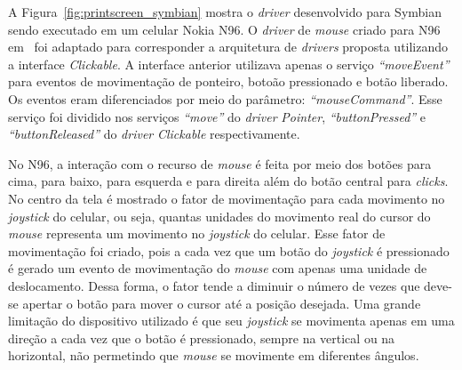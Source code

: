 A Figura~\ref{fig:printscreen_symbian} mostra o \emph{driver} desenvolvido para Symbian sendo executado em um celular Nokia N96. O \emph{driver} de \emph{mouse} criado para N96 em~\cite{buzeto2010} foi adaptado para corresponder a arquitetura de \emph{drivers} proposta utilizando a interface \emph{Clickable}. A interface anterior utilizava apenas o serviço \emph{``moveEvent''}	para eventos de movimentação de ponteiro, botoão pressionado e botão liberado. Os eventos eram diferenciados por meio do parâmetro: \emph{``mouseCommand''}. Esse serviço foi dividido nos serviços \emph{``move''} do \emph{driver} \emph{Pointer}, \emph{``buttonPressed''} e \emph{``buttonReleased''} do \emph{driver} \emph{Clickable} respectivamente.

No N96, a interação com o recurso de \emph{mouse} é feita por meio dos botões para cima, para baixo, para esquerda e para direita além do botão central para \emph{clicks}. No centro da tela é mostrado o fator de movimentação para cada movimento no \emph{joystick} do celular, ou seja, quantas unidades do movimento real do cursor do \emph{mouse} representa um movimento no \emph{joystick} do celular. Esse fator de movimentação foi criado, pois a cada vez que um botão do \emph{joystick} é pressionado é gerado um evento de movimentação do \emph{mouse} com apenas uma unidade de deslocamento. Dessa forma, o fator tende a diminuir o número de vezes que deve-se apertar o botão para mover o cursor até a posição desejada. Uma grande limitação do dispositivo utilizado é que seu \emph{joystick} se movimenta apenas em uma direção a cada vez que o botão é pressionado, sempre na vertical ou na horizontal, não permetindo que \emph{mouse} se movimente em diferentes ângulos.

